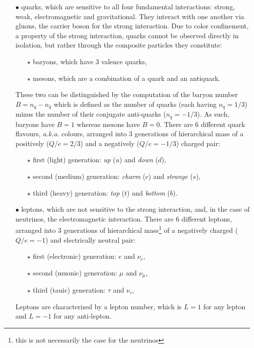 \begin{itemize}
\item[$\bullet$] quarks, which are sensitive to all four fundamental interactions: strong, weak, electromagnetic and gravitational. They interact with one another via gluons, the carrier boson for the strong interaction. Due to color confinement, a property of the strong interaction, quarks cannot be observed directly in isolation, but rather through the composite particles they constitute:\\
\begin{itemize}
\item[$\star$] baryons, which have 3 valence quarks,\\
\item[$\star$] mesons, which are a combination of a quark and an antiquark. \\
\end{itemize}
These two can be distinguished by the computation of the baryon number $B = n_q - n_{\bar{q}}$ which is defined as the number of quarks (each having $n_q = 1/3$) minus the number of their conjugate anti-quarks ($n_q = -1/3$). As such, baryons have $B=1$ whereas mesons have $B=0$. There are 6 different quark flavours, \textit{a.k.a.} colours, arranged into 3 generations of hierarchical mass of a positively ($Q/e=2/3$) and a negatively ($Q/e=-1/3$) charged pair:\\
\begin{itemize}
\item[$\star$] first (light) generation: \textit{up} ($u$) and \textit{down} ($d$), \\
\item[$\star$] second (medium) generation: \textit{charm} ($c$) and \textit{strange} ($s$), \\
\item[$\star$] third (heavy) generation: \textit{top} ($t$) and \textit{bottom} ($b$). \\
\end{itemize}

\item[$\bullet$] leptons, which are not sensitive to the strong interaction, and, in the case of neutrinos, the electromagnetic interaction. There are 6 different leptons, arranged into 3 generations of hierarchical mass\footnote{this is not necessarily the case for the neutrinos} of a negatively charged ($Q/e=-1$) and electrically neutral pair: \\
\begin{itemize}
\item[$\star$] first (electronic) generation: $e$ and $\nu_e$, \\
\item[$\star$] second (muonic) generation: $\mu$ and $\nu_\mu$, \\
\item[$\star$] third (tauic) generation: $\tau$ and $\nu_\tau$, \\
\end{itemize}
Leptons are characterized by a lepton number, which is $L=1$ for any lepton and $L=-1$ for any anti-lepton. \\
\end{itemize}

